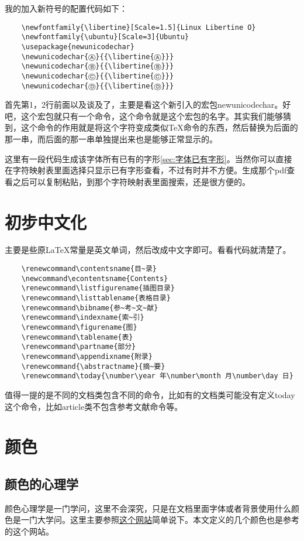\documentclass[11pt,oneside]{book}
\begin{document}
  我的加入新符号的配置代码如下：
  \begin{Verbatim}
    \newfontfamily{\libertine}[Scale=1.5]{Linux Libertine O}
    \newfontfamily{\ubuntu}[Scale=3]{Ubuntu}
    \usepackage{newunicodechar}
    \newunicodechar{Ⓐ}{{\libertine{Ⓐ}}}
    \newunicodechar{Ⓑ}{{\libertine{Ⓑ}}}
    \newunicodechar{Ⓒ}{{\libertine{Ⓒ}}}
    \newunicodechar{Ⓓ}{{\libertine{Ⓓ}}}
  \end{Verbatim}

  首先第1，2行前面以及谈及了，主要是看这个新引入的宏包newunicodechar。好吧，这个宏包就只有一个命令，这个命令就是这个宏包的名字。其实我们能够猜到，这个命令的作用就是将这个字符变成类似\TeX 命令的东西，然后替换为后面的那一串，而后面的那一串单独提出来也是能够正常显示的。


  这里有一段代码生成该字体所有已有的字形\ref{sec:字体已有字形}。当然你可以直接在字符映射表里面选择只显示已有字形查看，不过有时并不方便。生成那个pdf查看之后可以复制粘贴，到那个字符映射表里面搜索，还是很方便的。


  \chapter{初步中文化}
  主要是些原\LaTeX 常量是英文单词，然后改成中文字即可。看看代码就清楚了。
  \begin{Verbatim}
    \renewcommand\contentsname{目~录}
    \newcommand\econtentsname{Contents}
    \renewcommand\listfigurename{插图目录}
    \renewcommand\listtablename{表格目录}
    \renewcommand\bibname{参~考~文~献}
    \renewcommand\indexname{索~引}
    \renewcommand\figurename{图}
    \renewcommand\tablename{表}
    \renewcommand\partname{部分}
    \renewcommand\appendixname{附录}
    \renewcommand{\abstractname}{摘~要}
    \renewcommand\today{\number\year 年\number\month 月\number\day 日}
  \end{Verbatim}

  值得一提的是不同的文档类包含不同的命令，比如有的文档类可能没有定义today这个命令，比如article类不包含参考文献命令等。



  \chapter{颜色}
  \label{sec:颜色}
  \section{颜色的心理学}
  颜色心理学是一门学问，这里不会深究，只是在文档里面字体或者背景使用什么颜色是一门大学问。这里主要参照\href{http://www.jb51.net/article/8216.htm}{这个网站}简单说下。本文定义的几个颜色也是参考的这个网站。
\end{document}
